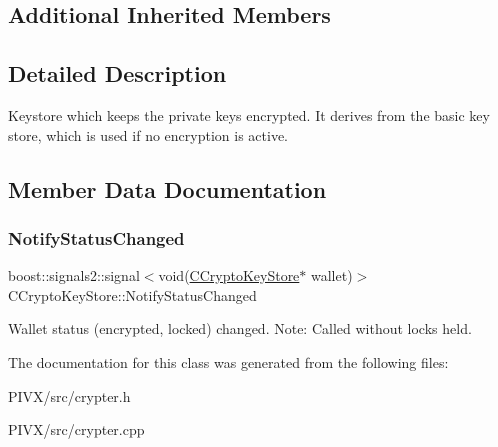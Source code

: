 \subsection*{Additional Inherited Members}


\subsection{Detailed Description}
Keystore which keeps the private keys encrypted. It derives from the basic key store, which is used if no encryption is active. 

\subsection{Member Data Documentation}
\mbox{\label{class_c_crypto_key_store_aeeb1c466663df6be9be54b1833e0f888}} 
\subsubsection{\texorpdfstring{Notify\+Status\+Changed}{NotifyStatusChanged}}
{\footnotesize\ttfamily boost\+::signals2\+::signal$<$void(\mbox{\hyperlink{class_c_crypto_key_store}{C\+Crypto\+Key\+Store}}$\ast$ wallet)$>$ C\+Crypto\+Key\+Store\+::\+Notify\+Status\+Changed}

Wallet status (encrypted, locked) changed. Note\+: Called without locks held. 

The documentation for this class was generated from the following files\+:\begin{DoxyCompactItemize}
\item 
P\+I\+V\+X/src/crypter.\+h\item 
P\+I\+V\+X/src/crypter.\+cpp\end{DoxyCompactItemize}
